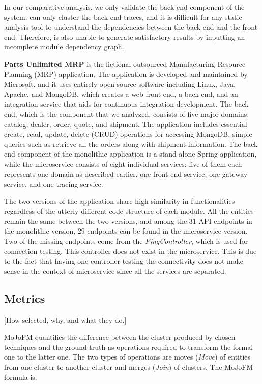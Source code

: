 In our comparative analysis, we only validate the back end component of the system. \fs can only cluster the back end traces, and it is difficult for any static analysis tool to understand the dependencies between the back end and the front end. Therefore, \bn is also unable to generate satisfactory results by inputting an incomplete module dependency graph.

\textbf{Parts Unlimited MRP} is the fictional outsourced Manufacturing Resource Planning (MRP) application. The application is developed and maintained by Microsoft, and it uses entirely open-source software including Linux, Java, Apache, and MongoDB, which creates a web front end, a back end, and an integration service that aids for continuous integration development. The back end, which is the component that we analyzed, consists of five major domains: catalog, dealer, order, quote, and shipment. The application includes essential create, read, update, delete (CRUD) operations for accessing MongoDB, simple queries such as retrieve all the orders along with shipment information. The back end component of the monolithic application is a stand-alone Spring application, while the microservice consists of eight individual services: five of them each represents one domain as described earlier, one front end service, one gateway service, and one tracing service. 

The two versions of the application share high similarity in functionalities regardless of the utterly different code structure of each module. All the entities remain the same between the two versions, and among the 31 API endpoints in the monolithic version, 29 endpoints can be found in the microservice version. Two of the missing endpoints come from the \textit{PingController}, which is used for connection testing. This controller does not exist in the microservice. This is due to the fact that having one controller testing the connectivity does not make sense in the context of microservice since all the services are separated.

 
\subsection{Metrics}\label{sec:metric}

[How selected, why, and what they do.]

MoJoFM quantifies the difference between the cluster produced by chosen techniques and the ground-truth as operations required to transform the formal one to the latter one. The two types of operations are moves (\textit{Move}) of entities from one cluster to another cluster and merges (\textit{Join}) of clusters. The MoJoFM formula is:

